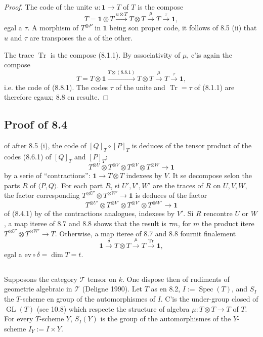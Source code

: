 \documentclass[11pt,a4paper]{article}
\theoremstyle{plain}
\theoremstyle{definition}
\DeclareMathOperator{\Spec}{Spec}
\DeclareMathOperator{\Tr}{Tr}
\DeclareMathOperator{\GL}{GL}
\newcommand{\ev}{\mathrm{ev}}
\begin{document}
\begin{proof}
The code of the unite $u : \mathbf{1} \to T$ of $T$ is the compose
\[
T = \mathbf{1} \otimes T \xrightarrow{u \otimes T} T \otimes T \xrightarrow{\mu} T \xrightarrow{\tau} \mathbf{1},
\]
egal a $\tau$. A morphism of $T^{\otimes P}$ in $\mathbf{1}$ being son proper code, it follows of 8.5 (ii) that $u$ and $\tau$ are transposes the a of the other.

The trace $\Tr$ is the compose (8.1.1). By associativity of $\mu$, c'is again the compose
\[
T = T \otimes \mathbf{1} \xrightarrow{T \otimes (8.8.1)} T \otimes T \xrightarrow{\mu} T \xrightarrow{\tau} \mathbf{1},
\]
i.e. the code of (8.8.1). The codes $\tau$ of the unite and $\Tr = \tau$ of (8.1.1) are therefore egaux; 8.8 en resulte.
\end{proof}

\subsection{Proof of 8.4}
of after 8.5 (i), the code of $[Q]_T \circ [P]_T$ is deduces of the tensor product of the codes (8.6.1) of $[Q]_T$ and $[P]_T$:
\[
T^{\otimes U} \otimes T^{\otimes V} \otimes T^{\otimes V} \otimes T^{\otimes W} \to \mathbf{1}
\]
by a serie of ``contractions'': $\mathbf{1} \to T \otimes T$ indexees by $V$. It se decompose selon the parts $R$ of $\langle P, Q \rangle$. For each part $R$, si $U', V', W'$ are the traces of $R$ on $U, V, W$, the factor corresponding $T^{\otimes U'} \otimes T^{\otimes W'} \to \mathbf{1}$ is deduces of the factor
\[
T^{\otimes U'} \otimes T^{\otimes V'} \otimes T^{\otimes V'} \otimes T^{\otimes W'} \to \mathbf{1}
\]
of (8.4.1) by of the contractions analogues, indexees by $V'$. Si $R$ rencontre $U$ or $W$, a map iteree of 8.7 and 8.8 shows that the result is $\tau m$, for $m$ the product itere $T^{\otimes U'} \otimes T^{\otimes W'} \to T$. Otherwise, a map iteree of 8.7 and 8.8 fournit finalement
\[
\mathbf{1} \xrightarrow{\delta} T \otimes T \xrightarrow{\mu} T \xrightarrow{\Tr} \mathbf{1},
\]
egal a $\ev \circ \delta = \dim T = t$.

\subsection{}
Supposons the category $\mathcal{T}$ tensor on $k$. One dispose then of rudiments of geometrie algebraic in $\mathcal{T}$ (Deligne 1990). Let $T$ as en 8.2, $I := \Spec(T)$, and $S_I$ the $T$-scheme en group of the automorphismes of $I$. C'is the under-group closed of $\GL(T)$ (see 10.8) which respecte the structure of algebra $\mu : T \otimes T \to T$ of $T$. For every $T$-scheme $Y$, $S_I(Y)$ is the group of the automorphismes of the $Y$-scheme $I_Y := I \times Y$.
\end{document}
